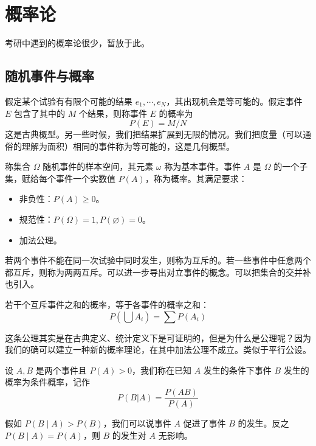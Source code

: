 \chapter{概率论}

考研中遇到的概率论很少，暂放于此。

\section{随机事件与概率}

假定某个试验有有限个可能的结果 $e_1, \cdots, e_N$，其出现机会是等可能的。假定事件 $E$ 包含了其中的 $M$ 个结果，则称事件 $E$ 的概率为
\[ P(E) = M / N \]
这是古典概型。另一些时候，我们把结果扩展到无限的情况。我们把度量（可以通俗的理解为面积）相同的事件称为等可能的，这是几何概型。

称集合 $\Omega$ 随机事件的样本空间，其元素 $\omega$ 称为基本事件。事件 $A$ 是 $\Omega$ 的一个子集，赋给每个事件一个实数值 $P(A)$，称为概率。其满足要求：

\begin{itemize}
	\item 非负性：$P(A) \geqslant 0$。
	\item 规范性：$P(\Omega) = 1, P(\varnothing) = 0$。
	\item 加法公理。
\end{itemize}

若两个事件不能在同一次试验中同时发生，则称为互斥的。若一些事件中任意两个都互斥，则称为两两互斥。可以进一步导出对立事件的概念。可以把集合的交并补也引入。

\begin{theorem}[加法公理]
	若干个互斥事件之和的概率，等于各事件的概率之和：
	\[ P\left(\bigcup A_i\right) = \sum P(A_i) \]
\end{theorem}

\begin{note}
	这条公理其实是在古典定义、统计定义下是可证明的，但是为什么是公理呢？因为我们的确可以建立一种新的概率理论，在其中加法公理不成立。类似于平行公设。
\end{note}

\begin{definition}
	设 $A,B$ 是两个事件且 $P(A) > 0$，我们称在已知 $A$ 发生的条件下事件 $B$ 发生的概率为条件概率，记作
	\[ P(B | A) = \frac{P(AB)}{P(A)} \]
\end{definition}

假如 $P(B \mid A) > P(B)$，我们可以说事件 $A$ 促进了事件 $B$ 的发生。反之 $P(B \mid A) = P(A)$，则 $B$ 的发生对 $A$ 无影响。

